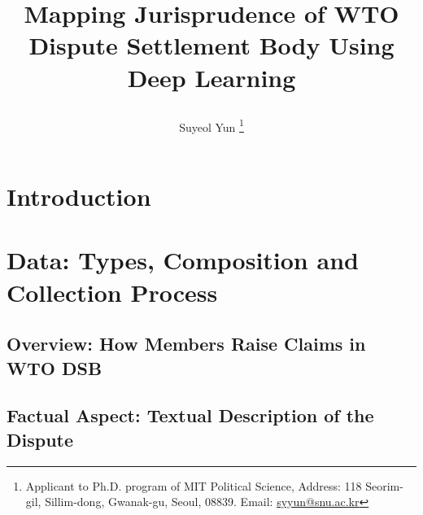 \documentclass[12pt,letterpaper]{article}
\newcommand{\tit}{
\bf 
Mapping Jurisprudence of WTO Dispute Settlement Body Using Deep Learning
}
\newcommand\spacingset[1]{\renewcommand{\baselinestretch}
{#1}\small\normalsize}
\begin{document}
\spacingset{1.25}

\setcounter{page}{0}
\vspace{-.1in}

{\title{
    \tit
  }
  \author{Suyeol Yun
  \thanks{Applicant to Ph.D. program of MIT Political Science,
  Address: 118 Seorim-gil, Sillim-dong, Gwanak-gu, Seoul,
  08839. Email: \href{mailto:syyun@snu.ac.kr}{syyun@snu.ac.kr}
  }
  }
  \maketitle
}

\thispagestyle{empty}
\vspace{-.1in}

\begin{abstract}
  
\end{abstract}

\spacingset{1.5} %

\clearpage

\section{Introduction}



% 
% 
% 
% 
% 
% 

\section{Data: Types, Composition and Collection Process} \label{sec:data}


\subsection{Overview: How Members Raise Claims in WTO DSB}


\subsection{Factual Aspect: Textual Description of the Dispute}

\end{document}
